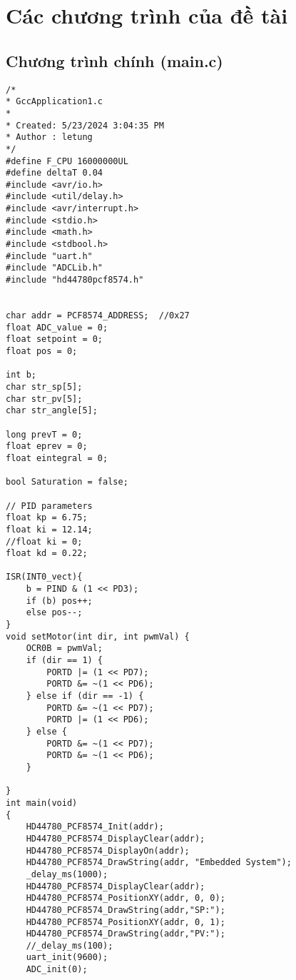 
\chapter{Các chương trình của đề tài} %

\label{AppendixA} %


\section{Chương trình chính (main.c)}

	\begin{lstlisting}
/*
* GccApplication1.c
*
* Created: 5/23/2024 3:04:35 PM
* Author : letung
*/ 
#define F_CPU 16000000UL
#define deltaT 0.04
#include <avr/io.h>
#include <util/delay.h>
#include <avr/interrupt.h>
#include <stdio.h>
#include <math.h>
#include <stdbool.h>
#include "uart.h"
#include "ADCLib.h"
#include "hd44780pcf8574.h"


char addr = PCF8574_ADDRESS;  //0x27
float ADC_value = 0;
float setpoint = 0;
float pos = 0;

int b;
char str_sp[5];
char str_pv[5]; 
char str_angle[5];

long prevT = 0;
float eprev = 0;
float eintegral = 0;

bool Saturation = false;

// PID parameters
float kp = 6.75;
float ki = 12.14;
//float ki = 0;
float kd = 0.22;

ISR(INT0_vect){
	b = PIND & (1 << PD3); 
	if (b) pos++;
	else pos--; 	
}
void setMotor(int dir, int pwmVal) {
	OCR0B = pwmVal;
	if (dir == 1) {
		PORTD |= (1 << PD7);
		PORTD &= ~(1 << PD6);
	} else if (dir == -1) {
		PORTD &= ~(1 << PD7);
		PORTD |= (1 << PD6);
	} else {
		PORTD &= ~(1 << PD7);
		PORTD &= ~(1 << PD6);
	}
	
}
int main(void)
{
	HD44780_PCF8574_Init(addr);
	HD44780_PCF8574_DisplayClear(addr);
	HD44780_PCF8574_DisplayOn(addr);
	HD44780_PCF8574_DrawString(addr, "Embedded System");
	_delay_ms(1000);
	HD44780_PCF8574_DisplayClear(addr);
	HD44780_PCF8574_PositionXY(addr, 0, 0);
	HD44780_PCF8574_DrawString(addr,"SP:");
	HD44780_PCF8574_PositionXY(addr, 0, 1);
	HD44780_PCF8574_DrawString(addr,"PV:");
	//_delay_ms(100);
	uart_init(9600);
	ADC_init(0);
	

\end{lstlisting}
